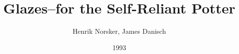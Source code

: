 \documentclass[10pt,a4paper]{book}
\begin{document}
\begin{titlepage}
\title{Glazes--for the Self-Reliant Potter}
\date{1993}
\author{Henrik Norsker, James Danisch}
\maketitle
\end{titlepage}
\tableofcontents

















\begin{appendix}
%
%
%
%
%
%
%







%
%
\end{appendix}
\end{document}
